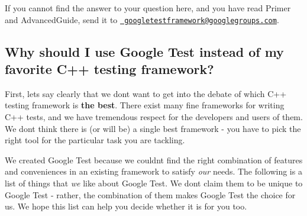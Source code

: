 If you cannot find the answer to your question here, and you have read Primer and Advanced\+Guide, send it to \href{mailto:googletestframework@googlegroups.com}\texttt{ googletestframework@googlegroups.\+com}.

\subsection*{Why should I use Google Test instead of my favorite C++ testing framework?}

First, let\textquotesingle{}s say clearly that we don\textquotesingle{}t want to get into the debate of which C++ testing framework is {\bfseries{the best}}. There exist many fine frameworks for writing C++ tests, and we have tremendous respect for the developers and users of them. We don\textquotesingle{}t think there is (or will be) a single best framework -\/ you have to pick the right tool for the particular task you are tackling.

We created Google Test because we couldn\textquotesingle{}t find the right combination of features and conveniences in an existing framework to satisfy {\itshape our} needs. The following is a list of things that {\itshape we} like about Google Test. We don\textquotesingle{}t claim them to be unique to Google Test -\/ rather, the combination of them makes Google Test the choice for us. We hope this list can help you decide whether it is for you too.


